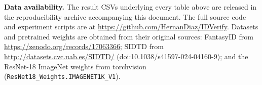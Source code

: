 \documentclass[11pt]{article}
\begin{document}
\vspace{8pt}
\noindent\textbf{Data availability.} The result CSVs underlying every table
above are released in the reproducibility archive accompanying this document.
The full source code and experiment scripts are at
\url{https://github.com/HernanDiaz/IDVerify}. Datasets and pretrained weights are
obtained from their original sources: FantasyID from
\url{https://zenodo.org/records/17063366}; SIDTD from
\url{http://datasets.cvc.uab.es/SIDTD/} (doi:10.1038/s41597-024-04160-9); and the
ResNet-18 ImageNet weights from torchvision
(\texttt{ResNet18\_Weights.IMAGENET1K\_V1}).
\end{document}
